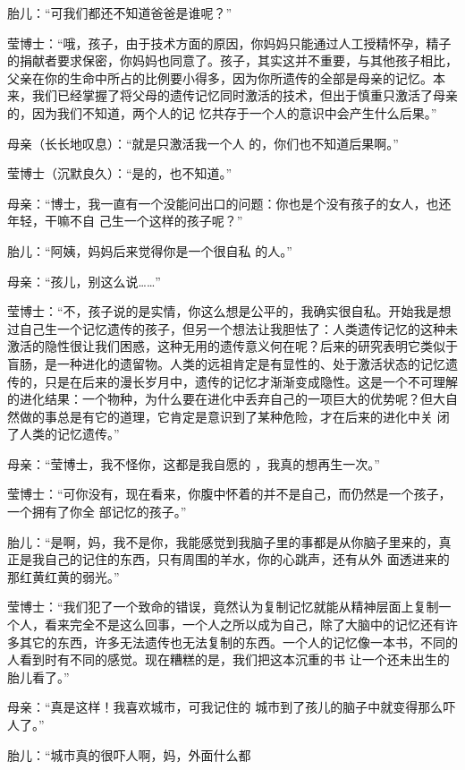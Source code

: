 \documentclass{article}
\begin{document}
胎儿：“可我们都还不知道爸爸是谁呢？” 

莹博士：“哦，孩子，由于技术方面的原因，你妈妈只能通过人工授精怀孕，精子的捐献者要求保密，你妈妈也同意了。孩子，其实这并不重要，与其他孩子相比，父亲在你的生命中所占的比例要小得多，因为你所遗传的全部是母亲的记忆。本来，我们已经掌握了将父母的遗传记忆同时激活的技术，但出于慎重只激活了母亲的，因为我们不知道，两个人的记
忆共存于一个人的意识中会产生什么后果。” 

母亲（长长地叹息）：“就是只激活我一个人
的，你们也不知道后果啊。” 

莹博士（沉默良久）：“是的，也不知道。”

母亲：“博士，我一直有一个没能问出口的问题：你也是个没有孩子的女人，也还年轻，干嘛不自
己生一个这样的孩子呢？” 

\newpage

胎儿：“阿姨，妈妈后来觉得你是一个很自私
的人。” 


母亲：“孩儿，别这么说……” 

莹博士：“不，孩子说的是实情，你这么想是公平的，我确实很自私。开始我是想过自己生一个记忆遗传的孩子，但另一个想法让我胆怯了：人类遗传记忆的这种未激活的隐性很让我们困惑，这种无用的遗传意义何在呢？后来的研究表明它类似于盲肠，是一种进化的遗留物。人类的远祖肯定是有显性的、处于激活状态的记忆遗传的，只是在后来的漫长岁月中，遗传的记忆才渐渐变成隐性。这是一个不可理解的进化结果：一个物种，为什么要在进化中丢弃自己的一项巨大的优势呢？但大自然做的事总是有它的道理，它肯定是意识到了某种危险，才在后来的进化中关
闭了人类的记忆遗传。” 

母亲：“莹博士，我不怪你，这都是我自愿的
，我真的想再生一次。” 

\newpage

莹博士：“可你没有，现在看来，你腹中怀着的并不是自己，而仍然是一个孩子，一个拥有了你全
部记忆的孩子。” 

胎儿：“是啊，妈，我不是你，我能感觉到我脑子里的事都是从你脑子里来的，真正是我自己的记住的东西，只有周围的羊水，你的心跳声，还有从外
面透进来的那红黄红黄的弱光。” 

莹博士：“我们犯了一个致命的错误，竟然认为复制记忆就能从精神层面上复制一个人，看来完全不是这么回事，一个人之所以成为自己，除了大脑中的记忆还有许多其它的东西，许多无法遗传也无法复制的东西。一个人的记忆像一本书，不同的人看到时有不同的感觉。现在糟糕的是，我们把这本沉重的书
让一个还未出生的胎儿看了。” 

母亲：“真是这样！我喜欢城市，可我记住的
城市到了孩儿的脑子中就变得那么吓人了。” 

胎儿：“城市真的很吓人啊，妈，外面什么都
\newpage
\end{document}
